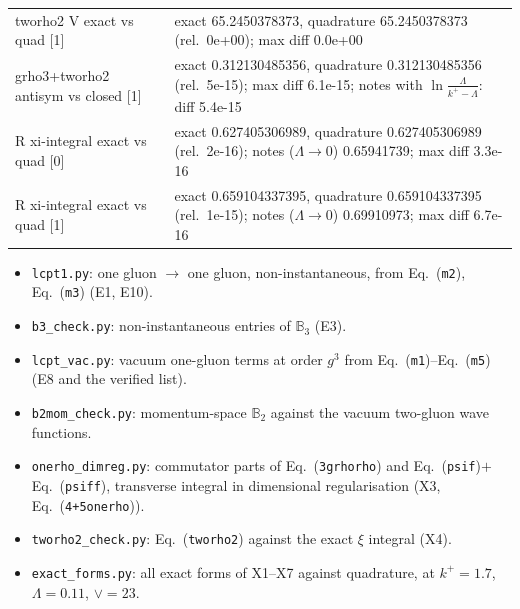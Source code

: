 \documentclass[10pt]{article}
\def\mf#1{\mathbb{#1}}
\newcommand{\eqn}[1]{Eq.~(\texttt{#1})}
\begin{document}
\begin{center}
\begin{longtable}{@{}p{}p{}@{}}
tworho2 V exact vs quad [1] & exact 65.2450378373, quadrature 65.2450378373 (rel.\ 0e+00); max diff 0.0e+00\\
grho3+tworho2 antisym vs closed [1] & exact 0.312130485356, quadrature 0.312130485356 (rel.\ 5e-15); max diff 6.1e-15; notes with $\ln\frac{\Lambda}{k^+-\Lambda}$: diff 5.4e-15\\
R xi-integral exact vs quad [0] & exact 0.627405306989, quadrature 0.627405306989 (rel.\ 2e-16); notes ($\Lambda\to0$) 0.65941739; max diff 3.3e-16\\
R xi-integral exact vs quad [1] & exact 0.659104337395, quadrature 0.659104337395 (rel.\ 1e-15); notes ($\Lambda\to0$) 0.69910973; max diff 6.7e-16\\
\bottomrule
\end{longtable}
\end{center}
\begin{itemize}
\item \texttt{lcpt1.py}: one gluon $\to$ one gluon, non-instantaneous, from \eqn{m2}, \eqn{m3} (E1, E10).
\item \texttt{b3\_check.py}: non-instantaneous entries of $\mf B_3$ (E3).
\item \texttt{lcpt\_vac.py}: vacuum one-gluon terms at order $g^3$ from \eqn{m1}--\eqn{m5} (E8 and the verified list).
\item \texttt{b2mom\_check.py}: momentum-space $\mf B_2$ against the vacuum two-gluon wave functions.
\item \texttt{onerho\_dimreg.py}: commutator parts of \eqn{3grhorho} and \eqn{psif}$+$\eqn{psiff}, transverse integral in dimensional regularisation (X3, \eqn{4+5onerho}).
\item \texttt{tworho2\_check.py}: \eqn{tworho2} against the exact $\xi$ integral (X4).
\item \texttt{exact\_forms.py}: all exact forms of X1--X7 against quadrature, at $k^+=1.7$, $\Lambda=0.11$, $\vee=23$.
\end{itemize}
\end{document}
